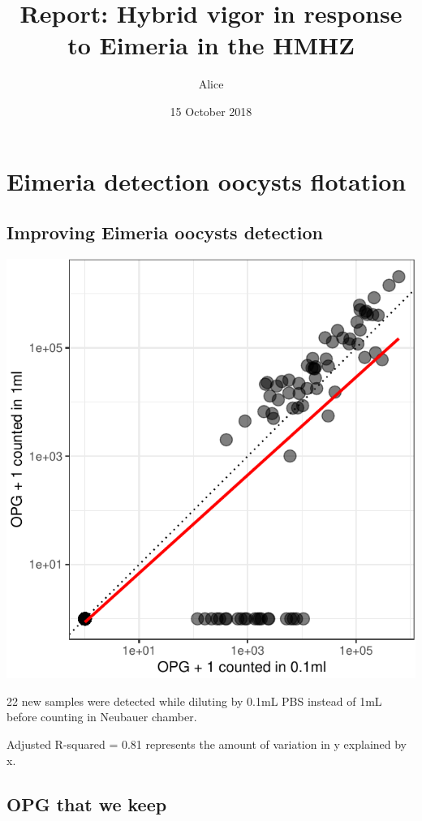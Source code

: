 \documentclass[]{article}
\title{Report: Hybrid vigor in response to Eimeria in the HMHZ}
\author{Alice}
\date{15 October 2018}
\begin{document}
\maketitle

{
\setcounter{tocdepth}{4}
\tableofcontents
}
\section{Eimeria detection oocysts
flotation}\label{eimeria-detection-oocysts-flotation}

\subsection{Improving Eimeria oocysts
detection}\label{improving-eimeria-oocysts-detection}

\includegraphics{Data_Analysis_Alice_files/figure-latex/oocystsDetec-1.pdf}

22 new samples were detected while diluting by 0.1mL PBS instead of 1mL
before counting in Neubauer chamber.

Adjusted R-squared = 0.81 represents the amount of variation in y
explained by x.

\subsection{OPG that we keep}\label{opg-that-we-keep}
\end{document}
